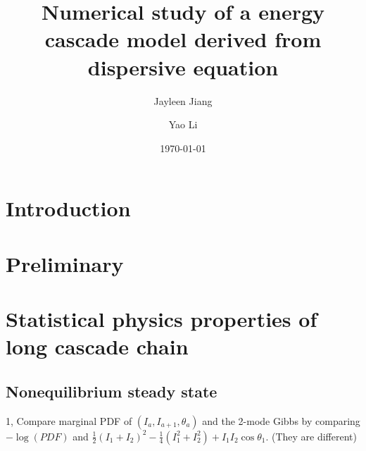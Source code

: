 \documentclass[12pt]{amsart}
\title[NLS numerical]{Numerical study of a energy cascade model derived from dispersive equation}
\author{Jayleen Jiang}
\author{Yao Li}
\date{\today}
\theoremstyle{definition}
\theoremstyle{remark}
\numberwithin{equation}{section}
\begin{document}
\maketitle

\section{Introduction}



\section{Preliminary}



\section{Statistical physics properties of long cascade chain}
\subsection{Nonequilibrium steady state}





1, Compare marginal PDF of $(I_a, I_{a+1}, \theta_a)$ and the 2-mode Gibbs by comparing $-\log(PDF)$ and $\frac{1}{2} (I_1 + I_2)^2 - \frac{1}{4} (I_1^2 + I_2^2) + I_1I_2\cos \theta_1$. (They are different)
\end{document}
